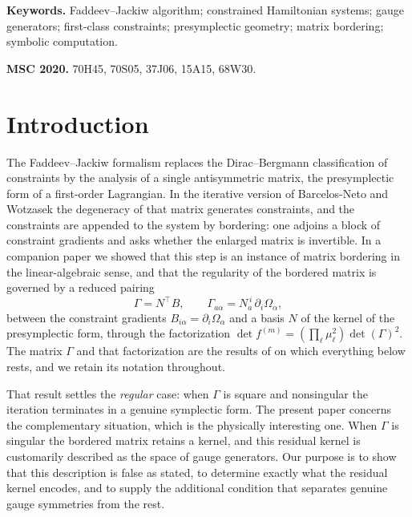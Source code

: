 \documentclass[12pt]{article}
\theoremstyle{plain}
\theoremstyle{definition}
\theoremstyle{remark}
\newcommand{\pd}[1]{\partial_{#1}}
\newcommand{\Om}{\Omega}
\begin{document}
	\noindent\textbf{Keywords.} Faddeev--Jackiw algorithm; constrained Hamiltonian
	systems; gauge generators; first-class constraints; presymplectic geometry;
	matrix bordering; symbolic computation.
	
	\medskip
	\noindent\textbf{MSC 2020.} 70H45, 70S05, 37J06, 15A15, 68W30.
	
	
	\section{Introduction}
	\label{sec:intro}
	
	The Faddeev--Jackiw formalism \cite{FJ1988} replaces the Dirac--Bergmann
	classification of constraints by the analysis of a single antisymmetric matrix,
	the presymplectic form of a first-order Lagrangian. In the iterative version of
	Barcelos-Neto and Wotzasek \cite{BNW1992,BNW1993} the degeneracy of that matrix
	generates constraints, and the constraints are appended to the system by
	bordering: one adjoins a block of constraint gradients and asks whether the
	enlarged matrix is invertible. In a companion paper \cite{CLMCP2026} we showed
	that this step is an instance of matrix bordering in the linear-algebraic sense,
	and that the regularity of the bordered matrix is governed by a reduced pairing
	\begin{equation}
		\Gamma=N^{\top}B,
		\qquad
		\Gamma_{a\alpha}=N_{a}^{\,i}\,\pd{i}\Om_{\alpha},
		\label{eq:intro-Gamma}
	\end{equation}
	between the constraint gradients $B_{i\alpha}=\pd{i}\Om_{\alpha}$ and a basis
	$N$ of the kernel of the presymplectic form, through the factorization
	$\det f^{(m)}=(\prod_{\ell}\mu_{\ell}^{2})\det(\Gamma)^{2}$. The matrix $\Gamma$
	and that factorization are the results of \cite{CLMCP2026} on which everything
	below rests, and we retain its notation throughout.
	
	That result settles the \emph{regular} case: when $\Gamma$ is square and
	nonsingular the iteration terminates in a genuine symplectic form. The present
	paper concerns the complementary situation, which is the physically interesting
	one. When $\Gamma$ is singular the bordered matrix retains a kernel, and this
	residual kernel is customarily described as the space of gauge generators. Our
	purpose is to show that this description is false as stated, to determine
	exactly what the residual kernel encodes, and to supply the additional condition
	that separates genuine gauge symmetries from the rest.
	
\end{document}
